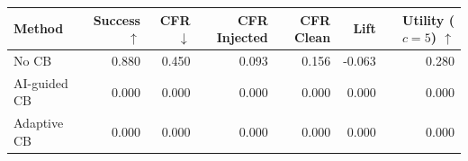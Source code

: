 \begin{tabular}{lrrrrrr}
\toprule
Method & Success $\uparrow$ & CFR $\downarrow$ & CFR Injected & CFR Clean & Lift & Utility ($c=5$) $\uparrow$ \\
\midrule
No CB & 0.880 & 0.450 & 0.093 & 0.156 & -0.063 & 0.280 \\
AI-guided CB & 0.000 & 0.000 & 0.000 & 0.000 & 0.000 & 0.000 \\
Adaptive CB & 0.000 & 0.000 & 0.000 & 0.000 & 0.000 & 0.000 \\
\bottomrule
\end{tabular}
